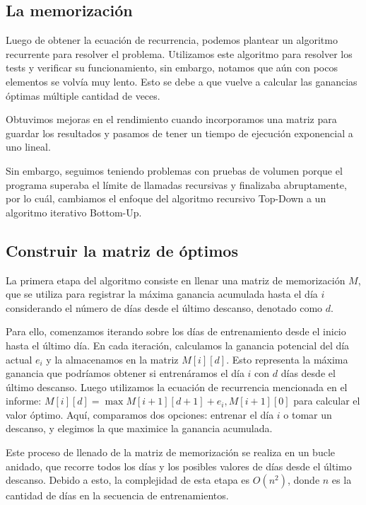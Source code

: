 \documentclass{estilo}
\begin{document}
\subsection{La memorización}
Luego de obtener la ecuación de recurrencia, podemos plantear un algoritmo recurrente para resolver el problema. Utilizamos este algoritmo para resolver los tests y verificar su funcionamiento, sin embargo, notamos que aún con pocos elementos se volvía muy lento. Esto se debe a que vuelve a calcular las ganancias óptimas múltiple cantidad de veces.

Obtuvimos mejoras en el rendimiento cuando incorporamos una matriz para guardar los resultados y pasamos de tener un tiempo de ejecución exponencial a uno lineal.

Sin embargo, seguimos teniendo problemas con pruebas de volumen porque el programa superaba el límite de llamadas recursivas y finalizaba abruptamente, por lo cuál, cambiamos el enfoque del algoritmo recursivo Top-Down a un algoritmo iterativo Bottom-Up.

\subsection{Construir la matriz de óptimos}
La primera etapa del algoritmo consiste en llenar una matriz de memorización $M$, que se utiliza para registrar la máxima ganancia acumulada hasta el día $i$ considerando el número de días desde el último descanso, denotado como $d$.

Para ello, comenzamos iterando sobre los días de entrenamiento desde el inicio hasta el último día.
En cada iteración, calculamos la ganancia potencial del día actual $e_i$ y la almacenamos en la matriz $M[i][d]$. Esto representa la máxima ganancia que podríamos obtener si entrenáramos el día $i$ con $d$ días desde el último descanso. Luego utilizamos la ecuación de recurrencia mencionada en el informe: $M[i][d] = \max{M[i+1][d+1] + e_i, M[i+1][0]}$ para calcular el valor óptimo. Aquí, comparamos dos opciones: entrenar el día $i$ o tomar un descanso, y elegimos la que maximice la ganancia acumulada.

Este proceso de llenado de la matriz de memorización se realiza en un bucle anidado, que recorre todos los días y los posibles valores de días desde el último descanso. Debido a esto, la complejidad de esta etapa es $O(n^2)$, donde $n$ es la cantidad de días en la secuencia de entrenamientos.
\end{document}
